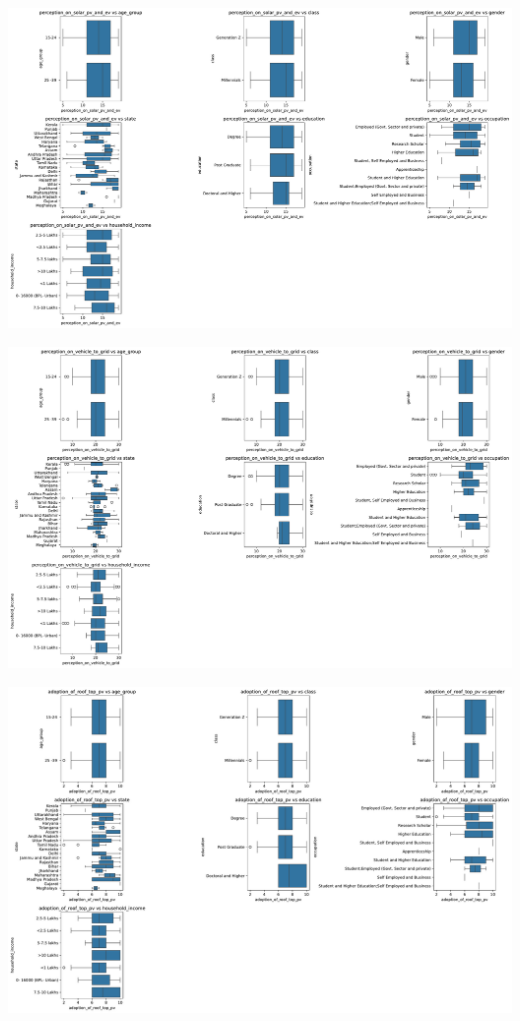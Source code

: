 \documentclass[
  letterpaper,
  DIV=11,
  numbers=noendperiod]{scrartcl}
\begin{document}
\includegraphics{index_files/figure-pdf/cell-5-output-7.pdf}

\includegraphics{index_files/figure-pdf/cell-5-output-8.pdf}

\includegraphics{index_files/figure-pdf/cell-5-output-9.pdf}
\end{document}
